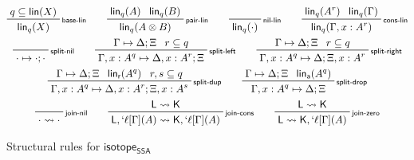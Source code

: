 \documentclass[acmsmall,screen,review]{acmart}
\newcommand{\ms}[1]{\ensuremath{\mathsf{#1}}}
\newcommand{\lbl}[1]{{`#1}}
\newcommand{\csplits}[3]{#1 \mapsto #2;#3}
\newcommand{\lwk}[2]{#1 \rightsquigarrow #2}
\newcommand{\tlin}[2]{\ms{lin}_{#2}(#1)}
\newcommand{\ltlin}[3]{\ms{lin}_{#3}(#1^{#2})}
\newcommand{\thyp}[3]{#1: {#2}^{#3}}
\newcommand{\lhyp}[3]{#1[#2](#3)}
\newcommand{\llhyp}[3]{\lhyp{\lbl{#1}}{#2}{#3}}
\newcommand{\rle}[1]{{\scriptsize\textsf{#1}}}
\newcommand{\taff}{\ms{a}}
\newcommand{\trel}{\ms{r}}
\newcommand{\isotopessa}{\ms{isotope_{SSA}}}
\begin{document}
\begin{figure}
  \begin{gather*}    
    \prftree[r]{\rle{base-lin}}{q \subseteq \ms{lin}(X)}{\tlin{X}{q}} \qquad
    \prftree[r]{\rle{pair-lin}}{\tlin{A}{q}}{\tlin{B}{q}}{\tlin{A \otimes B}{q}} \qquad
    \prftree[r]{\rle{nil-lin}}{\tlin{\cdot}{q}} \qquad
    \prftree[r]{\rle{cons-lin}}{\ltlin{A}{r}{q}}{\tlin{\Gamma}{q}}
      {\tlin{\Gamma, \thyp{x}{A}{r}}{q}} \\
    \prftree[r]{\rle{split-nil}}{\csplits{\cdot}{\cdot}{\cdot}} \qquad
    \prftree[r]{\rle{split-left}}
      {\csplits{\Gamma}{\Delta}{\Xi}}
      {r \subseteq q}
      {\csplits{\Gamma, \thyp{x}{A}{q}}{\Delta, \thyp{x}{A}{r}}{\Xi}} \qquad
    \prftree[r]{\rle{split-right}}
      {\csplits{\Gamma}{\Delta}{\Xi}}
      {r \subseteq q}
      {\csplits{\Gamma, \thyp{x}{A}{q}}{\Delta}{\Xi, \thyp{x}{A}{r}}} \\
    \prftree[r]{\rle{split-dup}}
      {\csplits{\Gamma}{\Delta}{\Xi}}
      {\ltlin{A}{q}{\trel}}
      {r, s \subseteq q}
      {\csplits{\Gamma, \thyp{x}{A}{q}}{\Delta, \thyp{x}{A}{r}}{\Xi, \thyp{x}{A}{s}}}
      \qquad
    \prftree[r]{\rle{split-drop}}
      {\csplits{\Gamma}{\Delta}{\Xi}}
      {\ltlin{A}{q}{\taff}}
      {\csplits{\Gamma, \thyp{x}{A}{q}}{\Delta}{\Xi}}
      \\
    \prftree[r]{\rle{join-nil}}{\lwk{\cdot}{\cdot}} \qquad
    \prftree[r]{\rle{join-cons}}
      {\lwk{\ms{L}}{\ms{K}}}
      {\lwk{\ms{L}, \llhyp{\ell}{\Gamma}{A}}{\ms{K}, \llhyp{\ell}{\Gamma}{A}}} 
      \qquad
    \prftree[r]{\rle{join-zero}}
      {\lwk{\ms{L}}{\ms{K}}}
      {\lwk{\ms{L}}{\ms{K}, \llhyp{\ell}{\Gamma}{A}}} 
  \end{gather*}
  \caption{Structural rules for \isotopessa}
  \label{fig:ssa-structural}
\end{figure}
\end{document}
